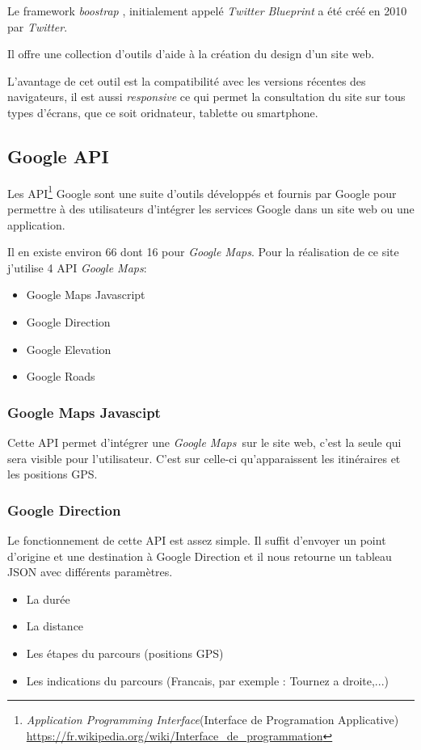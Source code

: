 \documentclass[a4paper]{article}
\newcommand{\gmap}{\emph{Google Maps}}
\newcommand{\bt}{\emph{boostrap }}
\begin{document}
Le framework \bt, initialement appelé \emph{Twitter Blueprint} a été créé en 2010 par \emph{Twitter}.

Il offre une collection d'outils d'aide à la création du design d'un site web.

L'avantage de cet outil est la compatibilité avec les versions récentes des navigateurs, il est aussi \emph{responsive} ce qui permet la consultation du site sur tous types d'écrans, que ce soit oridnateur, tablette ou smartphone.



\subsection{Google API}
Les API\footnote{\emph{Application Programming Interface}(Interface de Programation Applicative) \url{https://fr.wikipedia.org/wiki/Interface_de_programmation}} Google sont une suite d'outils développés et fournis par Google pour permettre à des utilisateurs d'intégrer les services Google dans un site web ou une application.

Il en existe environ 66 dont 16 pour \gmap. Pour la réalisation de ce site j'utilise 4 API \gmap : 
\begin{itemize}
    \item Google Maps Javascript
    \item Google Direction
    \item Google Elevation
    \item Google Roads
\end{itemize}

\subsubsection{Google Maps Javascipt}
Cette API permet d'intégrer une \gmap \ sur le site web, c'est la seule qui sera visible pour l'utilisateur. C'est sur celle-ci qu'apparaissent les itinéraires et les positions GPS.
\subsubsection{Google Direction}
Le fonctionnement de cette API est assez simple. Il suffit d'envoyer un point d'origine et une destination à Google Direction et il nous retourne un tableau JSON avec différents paramètres.
\begin{itemize}
    \item La durée
    \item La distance
    \item Les étapes du parcours (positions GPS)
    \item Les indications du parcours (Francais, par exemple : Tournez a droite,...)
\end{itemize}
\end{document}
